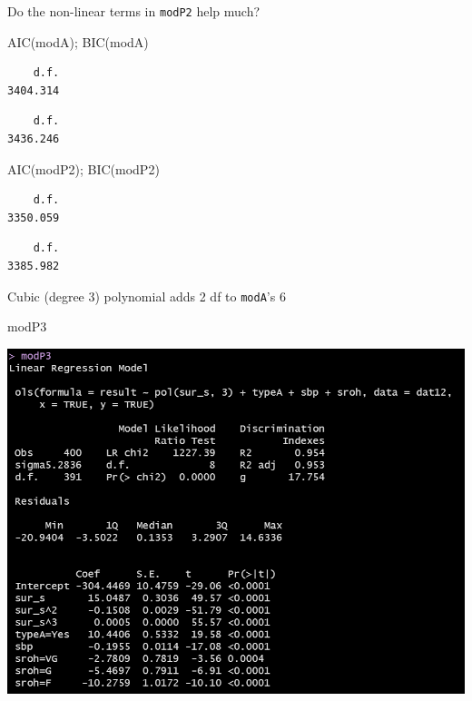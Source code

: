 \documentclass[
  ignorenonframetext,
]{beamer}
\newenvironment{Shaded}{\begin{snugshade}}{\end{snugshade}}
\newcommand{\FunctionTok}[1]{\textcolor[rgb]{0.00,0.00,0.00}{#1}}
\newcommand{\NormalTok}[1]{#1}
\begin{document}
\begin{frame}[fragile]{Do the non-linear terms in \texttt{modP2} help
much?}
\protect\hypertarget{do-the-non-linear-terms-in-modp2-help-much}{}
\begin{Shaded}
\begin{Highlighting}[]
\FunctionTok{AIC}\NormalTok{(modA); }\FunctionTok{BIC}\NormalTok{(modA)}
\end{Highlighting}
\end{Shaded}

\begin{verbatim}
    d.f. 
3404.314 
\end{verbatim}

\begin{verbatim}
    d.f. 
3436.246 
\end{verbatim}

\begin{Shaded}
\begin{Highlighting}[]
\FunctionTok{AIC}\NormalTok{(modP2); }\FunctionTok{BIC}\NormalTok{(modP2)}
\end{Highlighting}
\end{Shaded}

\begin{verbatim}
    d.f. 
3350.059 
\end{verbatim}

\begin{verbatim}
    d.f. 
3385.982 
\end{verbatim}
\end{frame}

\begin{frame}[fragile]{Cubic (degree 3) polynomial adds 2 df to
\texttt{modA}'s 6}
\protect\hypertarget{cubic-degree-3-polynomial-adds-2-df-to-modas-6}{}
\begin{Shaded}
\begin{Highlighting}[]
\NormalTok{modP3}
\end{Highlighting}
\end{Shaded}

\begin{center}\includegraphics[width=12.6in,height=0.65\textheight]{figures/small3} \end{center}
\end{frame}
\end{document}
